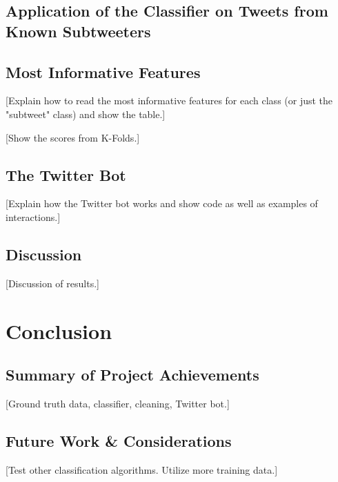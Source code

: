 \documentclass[11pt, twoside, reqno]{book}
\begin{document}
\section{Application of the Classifier on Tweets from Known Subtweeters}
\label{known_subtweeters_analysis}

\section{Most Informative Features}
\label{most_informative_features}

[Explain how to read the most informative features for each class (or just the "subtweet" class) and show the table.]

[Show the scores from K-Folds.]

\section{The Twitter Bot}
\label{the_twitter_bot}

[Explain how the Twitter bot works and show code as well as examples of interactions.]

\section{Discussion}
\label{discussion}

[Discussion of results.]

\chapter{Conclusion}
\label{conclusion}

\section{Summary of Project Achievements}
\label{summary}

[Ground truth data, classifier, cleaning, Twitter bot.]

\section{Future Work \& Considerations}
\label{future_work_and_considerations}

[Test other classification algorithms. Utilize more training data.]
\end{document}
